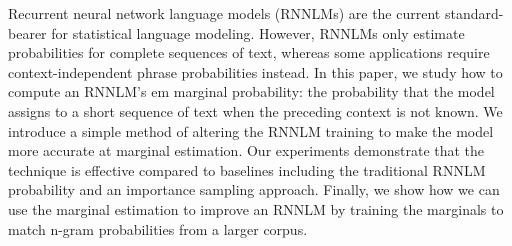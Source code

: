 Recurrent neural network language models (RNNLMs) are the current standard-bearer for statistical language modeling.  However, RNNLMs only estimate probabilities for complete sequences of text, whereas some applications require context-independent phrase probabilities instead.  In this paper, we study how to compute an RNNLM's em marginal probability: the probability that the model assigns to a short sequence of text when the preceding context is not known. We introduce a simple method of altering the RNNLM training to make the model more accurate at marginal estimation. Our experiments demonstrate that the technique is effective compared to baselines including the traditional RNNLM probability and an importance sampling approach. Finally, we show how we can use the marginal estimation to improve an RNNLM by training the marginals to match n-gram probabilities from a larger corpus.
